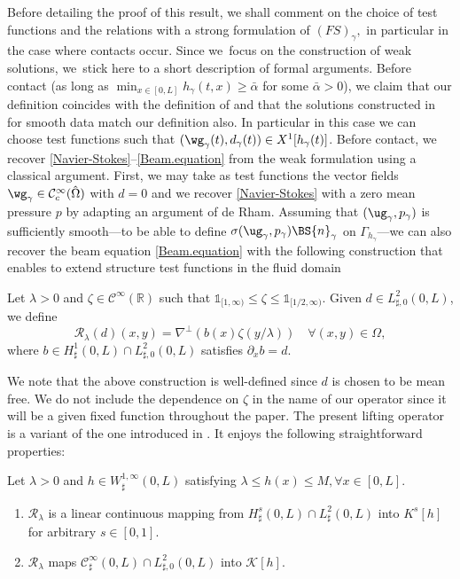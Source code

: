 Before detailing the proof of this result, we shall comment on the choice of test functions and the relations with a strong formulation of $(FS)_\gamma,$ in particular in the case where contacts occur. Since we~focus on the construction of weak solutions, we~stick here to a short description of formal arguments. Before contact (\ie as long as $\min_{x \in [0,L]} h_\gamma(t,x) \geq \bar{\alpha}$ for some $\bar{\alpha} >0$), we claim that our definition coincides with the definition of \cite{Chambolle-etal} and that the solutions constructed in \cite{Grandmont-Hillairet} for smooth data match our definition also. In particular in this case we can choose test functions such that $(\wg_\gamma(t), d_\gamma(t))\in X^1[h_\gamma(t)]$. Before contact,
we recover \eqref{Navier-Stokes}--\eqref{Beam.equation} from the weak formulation using a classical argument. First, we may take as
test functions the vector fields $\wg_\gamma \in \mathcal{C}^{\infty}_c(\hat \Omega)$ with $d = 0$ and we recover \eqref{Navier-Stokes} with a zero mean pressure $p$ by adapting an argument of de Rham. Assuming that
$(\ug_\gamma,p_\gamma)$ is sufficiently smooth---to be able to define $\sigma(\ug_\gamma,p_\gamma) \BS{n}_{\gamma}$
on $\Gamma_{h_{\gamma}}$---we can also recover the beam equation \eqref{Beam.equation} with the following construction that enables to extend structure test functions in the fluid domain

\begin{definition}
\label{def:R}
Let $\lambda >0$ and $\zeta \in \mathcal{C}^{\infty}(\mathbb R)$ such that
$\mathds{1}_{[1,\infty)} \leq \zeta \leq \mathds{1}_{[1/2,\infty)}. $
Given $d\in L_{\sharp,0}^2(0, L)$, we define
\[
\mathcal{R}_\lambda(d)(x,y)= \nabla^{\bot} (b(x) \zeta(y/\lambda)) \quad
\forall (x,y) \in \Omega,
\]
where $b \in H^{1}_{\sharp}(0,L) \cap L^2_{\sharp,0}(0,L)$ satisfies
$\partial_x b = d$.
\end{definition}

We note that the above construction is well-defined since $d$ is chosen to be mean free. We do not include the dependence on $\zeta$ in the name of our operator since it will be a given fixed function throughout the paper. The present lifting operator is a variant of the one introduced in \cite{Chambolle-etal}. It enjoys the following straightforward properties:

\begin{lemma}
Let $\lambda >0$ and $h\in W^{1, \infty}_\sharp(0, L)$ satisfying
$\lambda\leq h(x)\leq M, \forall x\in [0, L]$.
\begin{enumerate}
\item $\mathcal R_{\lambda}$ is a linear continuous mapping from $H^s_{\sharp}(0,L) \cap L^2_{\sharp}(0,L)$ into $K^s[h]$ for arbitrary $s \in [0,1]$.
\item $\mathcal R_{\lambda}$ maps $\mathcal{C}^{\infty}_{\sharp}(0,L) \cap L^2_{\sharp,0}(0,L)$
into $\mathcal K[h]$.
\end{enumerate}
\end{lemma}

